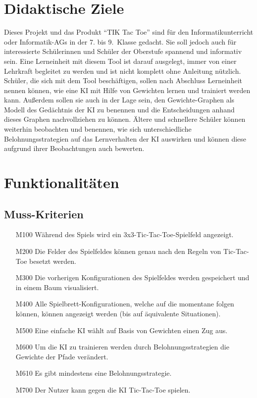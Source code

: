 \documentclass[titlepage]{scrartcl}
\newcommand{\TicTacToe}{TI\reflectbox K Tac Toe}
\begin{document}
\section{Didaktische Ziele}
Dieses Projekt und das Produkt "`\TicTacToe"' sind für den Informatikunterricht oder Informatik-AGs in der 7. bis 9.\ Klasse gedacht.
Sie soll jedoch auch für interessierte Schülerinnen und Schüler der Oberstufe spannend und informativ sein.
Eine Lerneinheit mit diesem Tool ist darauf ausgelegt, immer von einer Lehrkraft begleitet zu werden und ist nicht komplett ohne Anleitung nützlich.
Schüler, die sich mit dem Tool beschäftigen, sollen nach Abschluss Lerneinheit nennen können, wie eine KI mit Hilfe von Gewichten lernen und trainiert werden kann.
Außerdem sollen sie auch in der Lage sein, den Gewichte-Graphen als Modell des Gedächtnis der KI zu benennen und die Entscheidungen anhand dieses Graphen nachvollziehen zu können.
Ältere und schnellere Schüler können weiterhin beobachten und benennen,
wie sich unterschiedliche Belohnungsstrategien auf das Lernverhalten der KI auswirken und können diese aufgrund ihrer Beobachtungen auch bewerten.

\section{Funktionalitäten}%
\subsection{Muss-Kriterien}
	\begin{itemize}
		\item[M100] Während des Spiels wird ein 3x3-Tic-Tac-Toe-Spielfeld angezeigt.
		\item[M200] Die Felder des Spielfeldes können genau nach den Regeln von Tic-Tac-Toe besetzt werden.
		\item[M300] Die vorherigen Konfigurationen des Spielfeldes werden gespeichert und in einem Baum visualisiert.
		\item[M400] Alle Spielbrett-Konfigurationen, welche auf die momentane folgen können, können angezeigt werden (bis auf äquivalente Situationen).
		\item[M500] Eine einfache KI wählt auf Basis von Gewichten einen Zug aus.
		\item[M600] Um die KI zu trainieren werden durch Belohnungsstrategien die Gewichte der Pfade verändert.
		\item[M610] Es gibt mindestens eine Belohnungsstrategie.
		\item[M700] Der Nutzer kann gegen die KI Tic-Tac-Toe spielen.
	\end{itemize}
\end{document}
